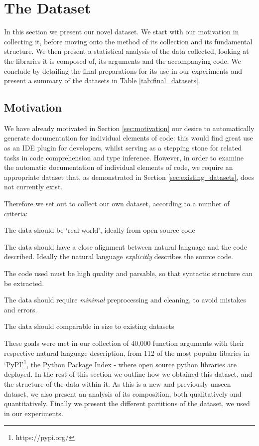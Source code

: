 \chapter{The Dataset}
\label{the_dataset}

In this section we present our novel dataset. We start with our motivation in collecting it, before moving onto the method of its collection and its fundamental structure. We then present a statistical analysis of the data collected, looking at the libraries it is composed of, its arguments and the accompanying code. We conclude by detailing the final preparations for its use in our experiments and present a summary of the datasets in Table \ref{tab:final_datasets}.

\section{Motivation}

We have already motivated in Section \ref{sec:motivation} our desire to automatically generate documentation for individual elements of code: this would find great use as an IDE plugin for developers, whilst serving as a stepping stone for related tasks in code comprehension and type inference.
However, in order to examine the automatic documentation of individual elements of code, we require an appropriate dataset that, as demonstrated in Section \ref{sec:existing_datasets}, does not currently exist.

Therefore we set out to collect our own dataset, according to a number of criteria:

\begin{tight_enumerate}
    \item The data should be `real-world', ideally from open source code
    \item The data should have a close alignment between natural language and the code described. Ideally the natural language \textit{explicitly} describes the source code.
    \item The code used must be high quality and parsable, so that syntactic structure can be extracted.
    \item The data should require \textit{minimal} preprocessing and cleaning, to avoid mistakes and errors.
    \item The data should comparable in size to existing datasets
\end{tight_enumerate}

These goals were met in our collection of 40,000 function arguments with their respective natural language description, from 112 of the most popular libaries in `PyPI'\footnote{https://pypi.org/}, the Python Package Index - where open source python libraries are deployed. In the rest of this section we outline how we obtained this dataset, and the structure of the data within it. As this is a new and previously unseen dataset, we also present an analysis of its composition, both qualitatively and quantitatively.
Finally we present the different partitions of the dataset, we used in our experiments.


